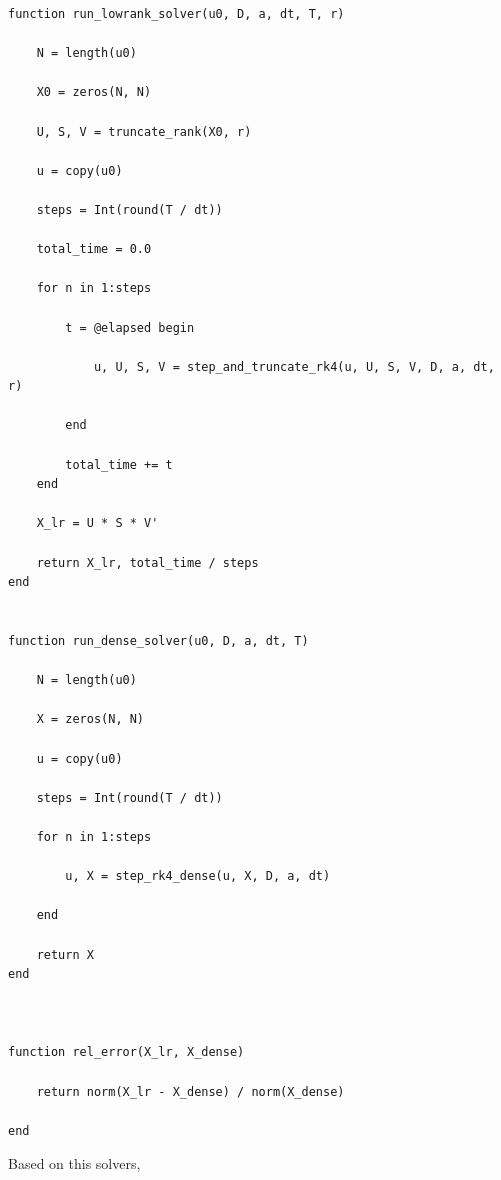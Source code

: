 \documentclass[11pt]{article}
\begin{document}
\begin{lstlisting}
function run_lowrank_solver(u0, D, a, dt, T, r)

    N = length(u0)

    X0 = zeros(N, N)

    U, S, V = truncate_rank(X0, r)

    u = copy(u0)

    steps = Int(round(T / dt))

    total_time = 0.0

    for n in 1:steps

        t = @elapsed begin

            u, U, S, V = step_and_truncate_rk4(u, U, S, V, D, a, dt, r)

        end

        total_time += t
    end

    X_lr = U * S * V'

    return X_lr, total_time / steps
end


function run_dense_solver(u0, D, a, dt, T)

    N = length(u0)

    X = zeros(N, N)

    u = copy(u0)

    steps = Int(round(T / dt))

    for n in 1:steps

        u, X = step_rk4_dense(u, X, D, a, dt)

    end

    return X
end



function rel_error(X_lr, X_dense)

    return norm(X_lr - X_dense) / norm(X_dense)

end
\end{lstlisting}

Based on this solvers,
\end{document}
